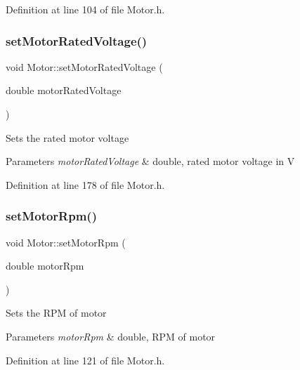Definition at line 104 of file Motor.\+h.

\mbox{\label{class_motor_aab754019236e34cba0acd3632567515e}} 
\subsubsection{\texorpdfstring{set\+Motor\+Rated\+Voltage()}{setMotorRatedVoltage()}}
{\footnotesize\ttfamily void Motor\+::set\+Motor\+Rated\+Voltage (\begin{DoxyParamCaption}\item[{double}]{motor\+Rated\+Voltage }\end{DoxyParamCaption})\hspace{0.3cm}{\ttfamily [inline]}}

Sets the rated motor voltage


\begin{DoxyParams}{Parameters}
{\em motor\+Rated\+Voltage} & double, rated motor voltage in V \\
\hline
\end{DoxyParams}


Definition at line 178 of file Motor.\+h.

\mbox{\label{class_motor_ac0fda674bd40e24bb864e8256fb5ba32}} 
\subsubsection{\texorpdfstring{set\+Motor\+Rpm()}{setMotorRpm()}}
{\footnotesize\ttfamily void Motor\+::set\+Motor\+Rpm (\begin{DoxyParamCaption}\item[{double}]{motor\+Rpm }\end{DoxyParamCaption})\hspace{0.3cm}{\ttfamily [inline]}}

Sets the R\+PM of motor


\begin{DoxyParams}{Parameters}
{\em motor\+Rpm} & double, R\+PM of motor \\
\hline
\end{DoxyParams}


Definition at line 121 of file Motor.\+h.

